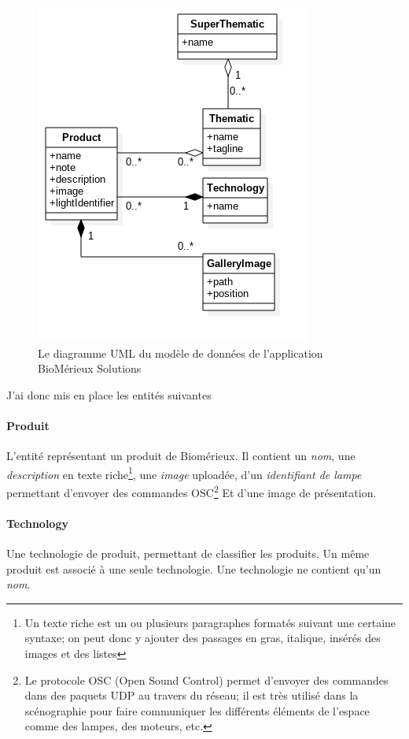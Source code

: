 \bigskip

\begin{figure}[h]
    \centering
    \includegraphics[scale=0.6]{img/uml-bmx-solution.png}
    \caption{Le diagramme UML du modèle de données de l'application BioMérieux Solutions}
\end{figure}

\clearpage

J'ai donc mis en place les entités suivantes

\paragraph{Produit} L'entité représentant un produit de Biomérieux.
Il contient un \emph{nom}, une \emph{description} en texte riche\footnote{Un texte riche est un ou plusieurs paragraphes formatés suivant une certaine syntaxe; on peut donc y ajouter des passages en gras, italique, insérés des images et des listes}, une \emph{image} uploadée, d'un \emph{identifiant de lampe} permettant d'envoyer des commandes OSC\footnote{Le protocole OSC (Open Sound Control) permet d'envoyer des commandes dans des paquets UDP au travers du réseau; il est très utilisé dans la scénographie pour faire communiquer les différents éléments de l'espace comme des lampes, des moteurs, etc.} Et d'une image de présentation.

\paragraph{Technology} Une technologie de produit, permettant de classifier les produits.
Un même produit est associé à une seule technologie.
Une technologie ne contient qu'un \emph{nom}.

